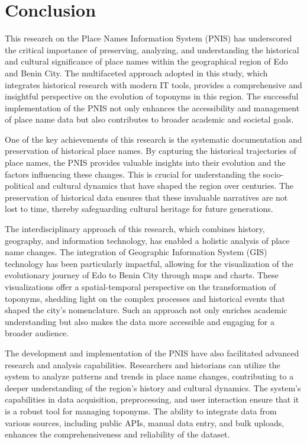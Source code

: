 \chapter{Conclusion}

This research on the Place Names Information System (PNIS) has underscored the critical importance of preserving, analyzing, and understanding the historical and cultural significance of place names within the geographical region of Edo and Benin City. The multifaceted approach adopted in this study, which integrates historical research with modern IT tools, provides a comprehensive and insightful perspective on the evolution of toponyms in this region. The successful implementation of the PNIS not only enhances the accessibility and management of place name data but also contributes to broader academic and societal goals.

One of the key achievements of this research is the systematic documentation and preservation of historical place names. By capturing the historical trajectories of place names, the PNIS provides valuable insights into their evolution and the factors influencing these changes. This is crucial for understanding the socio-political and cultural dynamics that have shaped the region over centuries. The preservation of historical data ensures that these invaluable narratives are not lost to time, thereby safeguarding cultural heritage for future generations.

The interdisciplinary approach of this research, which combines history, geography, and information technology, has enabled a holistic analysis of place name changes. The integration of Geographic Information System (GIS) technology has been particularly impactful, allowing for the visualization of the evolutionary journey of Edo to Benin City through maps and charts. These visualizations offer a spatial-temporal perspective on the transformation of toponyms, shedding light on the complex processes and historical events that shaped the city's nomenclature. Such an approach not only enriches academic understanding but also makes the data more accessible and engaging for a broader audience.

The development and implementation of the PNIS have also facilitated advanced research and analysis capabilities. Researchers and historians can utilize the system to analyze patterns and trends in place name changes, contributing to a deeper understanding of the region's history and cultural dynamics. The system's capabilities in data acquisition, preprocessing, and user interaction ensure that it is a robust tool for managing toponyms. The ability to integrate data from various sources, including public APIs, manual data entry, and bulk uploads, enhances the comprehensiveness and reliability of the dataset.

